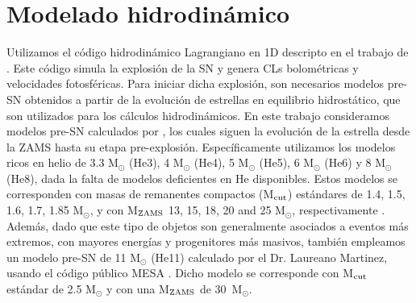 \documentclass[baaa]{baaa}
\begin{document}




\section{Modelado hidrodinámico}\label{sec:modelado}

Utilizamos el código hidrodinámico Lagrangiano en 1D descripto en el trabajo de \cite{Bersten:2011}. Este código simula la explosión de la SN y genera CLs bolométricas y velocidades fotosféricas. Para iniciar dicha explosión, son necesarios modelos pre-SN obtenidos a partir de la evolución de estrellas en equilibrio hidrostático, que son utilizados para los cálculos hidrodinámicos. En este trabajo consideramos modelos pre-SN calculados por \cite{Nomoto:1988}, los cuales siguen la evolución de la estrella desde la ZAMS hasta su etapa pre-explosión. Específicamente utilizamos los modelos ricos en helio de 3.3 M$_\odot$ (He3), 4 M$_\odot$ (He4), 5 M$_\odot$  (He5), 6 M$_\odot$ (He6) y 8 M$_\odot$ (He8), dada la falta de modelos deficientes en He disponibles. Estos modelos se corresponden con masas de remanentes compactos (M$_{\rm{cut}}$) estándares de 1.4, 1.5, 1.6, 1.7, 1.85 M$_\odot$, y con M$_{\rm{ZAMS}}$ 13, 15, 18, 20 and 25 M$_\odot$, respectivamente \citep{Sugimoto:1980,Tanaka:2009}. Además, dado que este tipo de objetos son generalmente asociados a eventos más extremos, con mayores energías y progenitores más masivos, también empleamos un modelo pre-SN de 11 M$_\odot$ (He11) calculado por el Dr. Laureano Martinez, usando el código público MESA \citep{Paxton:2011}. Dicho modelo se corresponde con M$_{\rm{cut}}$ estándar de 2.5 M$_\odot$ y con una M$_{\rm{ZAMS}}$ de \mbox{30 M$_\odot$.}
\end{document}
